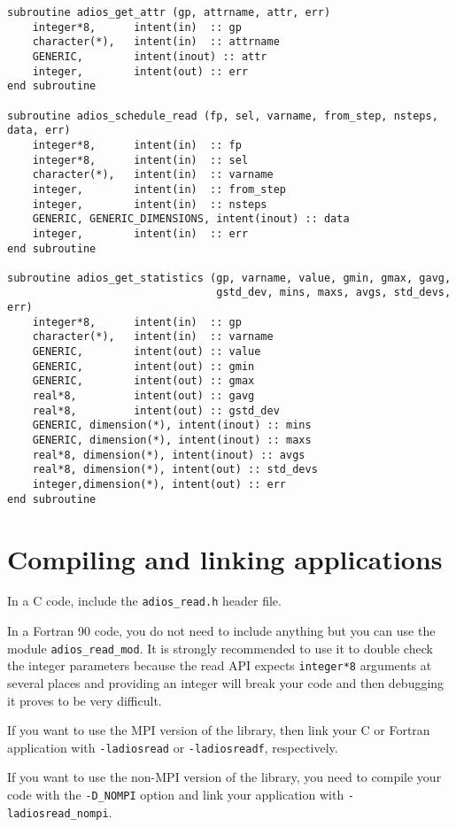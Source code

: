 \begin{lstlisting}[language=ADIOS,alsolanguage=Fortran]
subroutine adios_get_attr (gp, attrname, attr, err)
    integer*8,      intent(in)  :: gp
    character(*),   intent(in)  :: attrname
    GENERIC,        intent(inout) :: attr
    integer,        intent(out) :: err
end subroutine

subroutine adios_schedule_read (fp, sel, varname, from_step, nsteps, data, err)
    integer*8,      intent(in)  :: fp
    integer*8,      intent(in)  :: sel
    character(*),   intent(in)  :: varname
    integer,        intent(in)  :: from_step
    integer,        intent(in)  :: nsteps
    GENERIC, GENERIC_DIMENSIONS, intent(inout) :: data
    integer,        intent(in)  :: err
end subroutine

subroutine adios_get_statistics (gp, varname, value, gmin, gmax, gavg, 
                                 gstd_dev, mins, maxs, avgs, std_devs, err)
    integer*8,      intent(in)  :: gp
    character(*),   intent(in)  :: varname
    GENERIC,        intent(out) :: value
    GENERIC,        intent(out) :: gmin
    GENERIC,        intent(out) :: gmax
    real*8,         intent(out) :: gavg
    real*8,         intent(out) :: gstd_dev
    GENERIC, dimension(*), intent(inout) :: mins
    GENERIC, dimension(*), intent(inout) :: maxs
    real*8, dimension(*), intent(inout) :: avgs
    real*8, dimension(*), intent(out) :: std_devs
    integer,dimension(*), intent(out) :: err
end subroutine
\end{lstlisting}

\section{Compiling and linking applications}

In a C code, include the \verb+adios_read.h+ header file. 

In a Fortran 90 code, you do not need to include anything but you can use the module 
\verb+adios_read_mod+. It is strongly recommended to use it to double check the integer 
parameters because the read API expects \verb+integer*8+ arguments 
at several places and providing an integer will break your code and then debugging 
it proves to be very difficult.

If you want to use the MPI version of the library, then link your C or Fortran 
application with \verb+-ladiosread+ or \verb+-ladiosreadf+, respectively.

If you want to use the non-MPI version of the library, you need to compile your 
code with the \verb+-D_NOMPI+ option and link your application with \verb+-ladiosread_nompi+.

